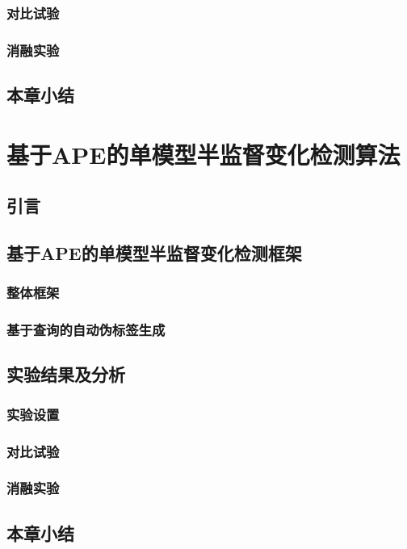 \documentclass[lang=chs, degree=master, blindreview=false, adobe=false]{yanputhesis}
\begin{document}
\subsection{对比试验}
\subsection{消融实验}
\section{本章小结}

\chapter{基于APE的单模型半监督变化检测算法}
\section{引言}
\section{基于APE的单模型半监督变化检测框架}
\subsection{整体框架}
\subsection{基于查询的自动伪标签生成}
\section{实验结果及分析}
\subsection{实验设置}
\subsection{对比试验}
\subsection{消融实验}
\section{本章小结}


\cleardoublepage
\appendix
\end{document}

